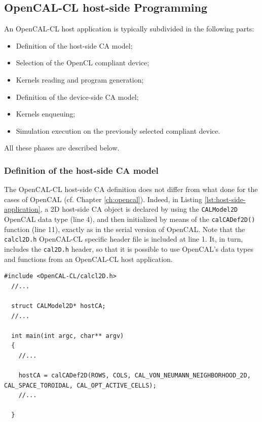 \subsection{OpenCAL-CL host-side Programming}

An OpenCAL-CL host application is typically
subdivided in the following parts:
\begin{itemize}
\item Definition of the host-side CA model;
\item Selection of the OpenCL compliant device;
\item Kernels reading and program generation;
\item Definition of the device-side CA model;
\item Kernels enqueuing;
\item Simulation execution on the previously selected compliant
  device.
\end{itemize}

All these phases are described below.

\subsubsection{Definition of the host-side CA model}

The OpenCAL-CL host-side CA definition does not differ from what done
for the cases of OpenCAL (cf. Chapter \ref{ch:opencal}). Indeed, in
Listing \ref{lst:host-side-application}, a 2D host-side CA object is
declared by using the \verb'CALModel2D' OpenCAL data type (line 4),
and then initialized by means of the \verb'calCADef2D()' function
(line 11), exactly as in the serial version of OpenCAL. Note that the
\verb'calcl2D.h' OpenCAL-CL specific header file is included at line
1. It, in turn, includes the \verb'cal2D.h' header, so that it is
possible to use OpenCAL's data types and functions from an OpenCAL-CL
host application.

\begin{lstlisting}[float,floatplacement=H, label=lst:host-side-application, caption={An example of OpenCAL-CL host-side application.}]
  #include <OpenCAL-CL/calcl2D.h>
  //...

  struct CALModel2D* hostCA;
  //...

  int main(int argc, char** argv)
  {
    //...

    hostCA = calCADef2D(ROWS, COLS, CAL_VON_NEUMANN_NEIGHBORHOOD_2D, CAL_SPACE_TOROIDAL, CAL_OPT_ACTIVE_CELLS);
    //...

  }
\end{lstlisting}



